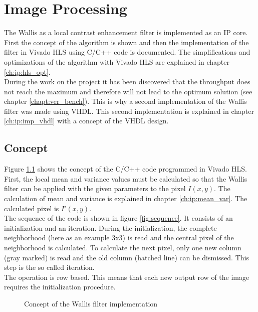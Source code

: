 %
%
\chapter{Image Processing}  \label{chapt:image_processing}
The Wallis as a local contrast enhancement filter is implemented as an IP core. First the concept of the algorithm is shown and then the implementation of the filter in Vivado HLS using C/C++ code is documented. The simplifications and optimizations of the algorithm with Vivado HLS are explained in chapter \ref{ch:ip:hls_opt}. \\
During the work on the project it has been discovered that the throughput does not reach the maximum and therefore will not lead to the optimum solution (see chapter \ref{chapt:ver_bench}). This is why a second implementation of the Wallis filter was made using VHDL. This second implementation is explained in chapter \ref{ch:ip:imp_vhdl} with a concept of the VHDL design.

\section{Concept} \label{ch:ip:concept}
Figure \ref{fig:concept} shows the concept of the C/C++ code programmed in Vivado HLS. First, the local mean and variance values must be calculated so that the Wallis filter can be applied with the given parameters to the pixel $I(x,y)$. The calculation of mean and variance is explained in chapter \ref{ch:ip:mean_var}. The calculated pixel is $I'(x,y)$. \\
The sequence of the code is shown in figure \ref{fig:sequence}. It consists of an initialization and an iteration. During the initialization, the complete neighborhood (here as an example 3x3) is read and the central pixel of the neighborhood is calculated. To calculate the next pixel, only one new column (gray marked) is read and the old column (hatched line) can be dismissed. This step is the so called iteration.\\
The operation is row based. This means that each new output row of the image requires the initialization procedure.

\begin{figure}[tb!]
    \centering
    \begin{adjustbox}{max width=\textwidth}
        
    \end{adjustbox}
    \caption{Concept of the Wallis filter implementation}
    \label{fig:concept}
\end{figure}

